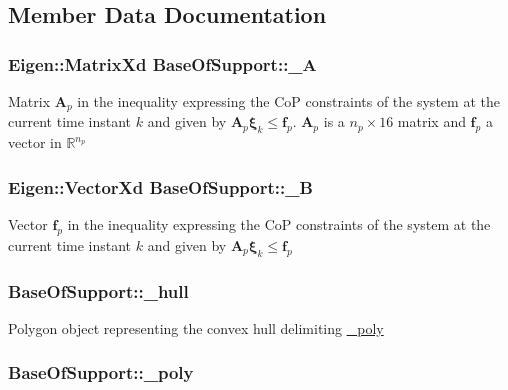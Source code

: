 \subsection{\-Member \-Data \-Documentation}
\hypertarget{classBaseOfSupport_a54a35d087a8dfaee9a27d025d46f706d}{
\subsubsection[{\-\_\-\-A}]{\setlength{\rightskip}{0pt plus 5cm}\-Eigen\-::\-Matrix\-Xd {\bf \-Base\-Of\-Support\-::\-\_\-\-A}}}\label{classBaseOfSupport_a54a35d087a8dfaee9a27d025d46f706d}
\-Matrix $\mathbf{A}_p$ in the inequality expressing the \-Co\-P constraints of the system at the current time instant $k$ and given by $\mathbf{A}_p \mathbf{\xi}_k \leq \mathbf{f}_p$. $\mathbf{A}_p$ is a $n_p \times 16$ matrix and $\mathbf{f}_p$ a vector in $\mathbb{R}^{n_p}$ \hypertarget{classBaseOfSupport_adfa70199064a50d9d7aea9a6d4b13246}{
\subsubsection[{\-\_\-\-B}]{\setlength{\rightskip}{0pt plus 5cm}\-Eigen\-::\-Vector\-Xd {\bf \-Base\-Of\-Support\-::\-\_\-\-B}}}\label{classBaseOfSupport_adfa70199064a50d9d7aea9a6d4b13246}
\-Vector $\mathbf{f}_p$ in the inequality expressing the \-Co\-P constraints of the system at the current time instant $k$ and given by $\mathbf{A}_p \mathbf{\xi}_k \leq \mathbf{f}_p$ \hypertarget{classBaseOfSupport_a3caa9bcea814865f12d891c0a1c8c4ea}{
\subsubsection[{\-\_\-hull}]{ {\bf \-Base\-Of\-Support\-::\-\_\-hull}}}\label{classBaseOfSupport_a3caa9bcea814865f12d891c0a1c8c4ea}
\-Polygon object representing the convex hull delimiting \hyperlink{classBaseOfSupport_a7e9b4ef515f90e2a7012871e7287bf5e}{\-\_\-poly} \hypertarget{classBaseOfSupport_a7e9b4ef515f90e2a7012871e7287bf5e}{
\subsubsection[{\-\_\-poly}]{ {\bf \-Base\-Of\-Support\-::\-\_\-poly}}}\label{classBaseOfSupport_a7e9b4ef515f90e2a7012871e7287bf5e}
